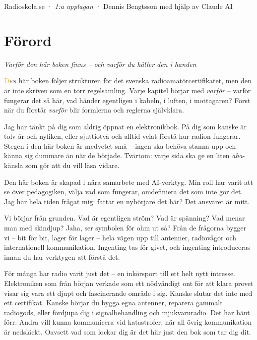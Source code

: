 \documentclass[a4paper,11pt,twoside]{book}
\begin{document}
\begin{titlepage}
\vfill

\begin{center}
{\headingfont\footnotesize\color{gray}Radioskola.se · \emph{1:a upplagan} · Dennis Bengtsson med hjälp av Claude AI}
\end{center}

\end{titlepage}
\pagecolor{white}
\color{black}

\chapter*{Förord}

{\itshape Varför den här boken finns – och varför du håller den i handen}

\vspace{4mm}

\lettrine[lines=3, loversize=0.1]{\textcolor{orange}{D}}{en} här boken följer strukturen för det svenska radioamatörcertifikatet, men den är inte skriven som en torr regelsamling. Varje kapitel börjar med \textit{varför} – varför fungerar det så här, vad händer egentligen i kabeln, i luften, i mottagaren? Först när du förstår \textit{varför} blir formlerna och reglerna självklara.

Jag har tänkt på dig som aldrig öppnat en elektronikbok. På dig som kanske är tolv år och nyfiken, eller sjuttiotvå och alltid velat förstå hur radion fungerar. Stegen i den här boken är medvetet små – ingen ska behöva stanna upp och känna sig dummare än när de började. Tvärtom: varje sida ska ge en liten \textit{aha}-känsla som gör att du vill läsa vidare.

Den här boken är skapad i nära samarbete med AI-verktyg. Min roll har varit att se över pedagogiken, välja vad som fungerar, omdefiniera det som inte gör det. Jag har hela tiden frågat mig: fattar en nybörjare det här? Det ansvaret är mitt.

Vi börjar från grunden. Vad är egentligen ström? Vad är spänning? Vad menar man med skindjup? Jaha, ser symbolen för ohm ut så?
Från de frågorna bygger vi – bit för bit, lager för lager – hela vägen upp till antenner, radiovågor och internationell kommunikation. Ingenting tas för givet, och ingenting introduceras innan du har verktygen att förstå det.

\vspace{4mm}

För många har radio varit just det – en inkörsport till ett helt nytt intresse. Elektroniken som från början verkade som ett nödvändigt ont för att klara provet visar sig vara ett djupt och fascinerande område i sig. Kanske slutar det inte med ett certifikat. Kanske börjar du bygga egna antenner, reparera gammalt radiogods, eller fördjupa dig i signalbehandling och mjukvaruradio. Det har hänt förr. Andra vill kunna kommunicera vid katastrofer, när all övrig kommunikation är nedsläckt. Oavsett vad som lockar dig är det här just den bok som tar dig dit.
\end{document}
